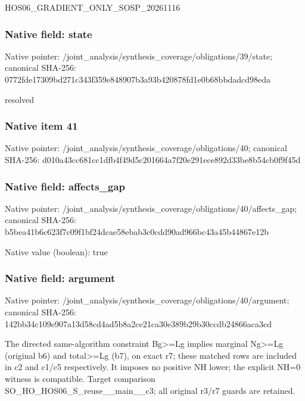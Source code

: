 \documentclass[10pt,a4paper]{article}
\begin{document}
\begingroup\raggedright\sloppy HOS06\_\allowbreak{}GRADIENT\_\allowbreak{}ONLY\_\allowbreak{}SOSP\_\allowbreak{}20261116\par\endgroup

\subsubsection{Native field: state}
Native pointer: /joint\_\allowbreak{}analysis/synthesis\_\allowbreak{}coverage/obligations/39/state; canonical SHA-256: 0772fde17309bd271c343f359e848907b3a93b420878fd1e0b68bbdadcd98eda

\begingroup\raggedright\sloppy resolved\par\endgroup

\subsubsection{Native item 41}
Native pointer: /joint\_\allowbreak{}analysis/synthesis\_\allowbreak{}coverage/obligations/40; canonical SHA-256: d010a43cc681cc1dfb4f49d5c201664a7f20e291ece892d33be8b54cb0f9f45d

\subsubsection{Native field: affects\_\allowbreak{}gap}
Native pointer: /joint\_\allowbreak{}analysis/synthesis\_\allowbreak{}coverage/obligations/40/affects\_\allowbreak{}gap; canonical SHA-256: b5bea41b6c623f7c09f1bf24dcae58ebab3c0cdd90ad966bc43a45b44867e12b

Native value (boolean): true

\subsubsection{Native field: argument}
Native pointer: /joint\_\allowbreak{}analysis/synthesis\_\allowbreak{}coverage/obligations/40/argument; canonical SHA-256: 142bb34c109e907a13d58cd4ad5b8a2ce21ca30e389b29b30ccdb24866aca3cd

\begingroup\raggedright\sloppy The directed same-algorithm constraint Bg>=\allowbreak{}Lg implies marginal Ng>=\allowbreak{}Lg (original b6) and total>=\allowbreak{}Lg (b7),\allowbreak{} on exact r7;\allowbreak{} these matched rows are included in c2 and c1/\allowbreak{}c5 respectively. It imposes no positive NH lower;\allowbreak{} the explicit NH=\allowbreak{}0 witness is compatible. Target comparison SO\_\allowbreak{}HO\_\allowbreak{}HOS06\_\allowbreak{}S\_\allowbreak{}reuse\_\allowbreak{}\_\allowbreak{}main\_\allowbreak{}\_\allowbreak{}c3;\allowbreak{} all original r3/\allowbreak{}r7 guards are retained.\par\endgroup
\end{document}
